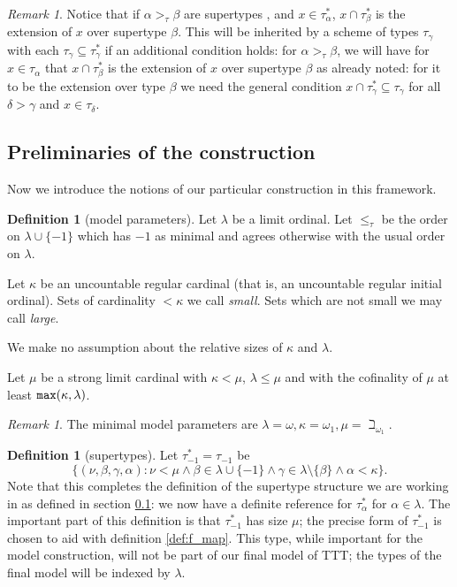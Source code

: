 \documentclass[112pt]{article}
\theoremstyle{definition}
\newtheorem{definition}[theorem]{Definition}
\theoremstyle{remark}
\newtheorem{remark}[theorem]{Remark}
\newcommand{\rk}[1]{{\color{blue}\sl #1}}
\begin{document}
\begin{remark}
Notice that if $\alpha>_\tau \beta$ are supertypes%
, and $x \in \tau^*_\alpha$, $x \cap \tau^*_\beta$ is the extension of $x$ over supertype $\beta$.  This will be inherited by a scheme of types $\tau_\gamma$ with each $\tau_\gamma \subseteq \tau^*_\gamma$ if an additional condition holds:  for $\alpha>_\tau\beta$, we will have
for $x \in \tau_\alpha$ that $x \cap \tau^*_\beta$ is the extension of $x$ over supertype $\beta$ as already noted:  for it to be the extension over type $\beta$ we need the general condition $x \cap \tau^*_\gamma \subseteq \tau_\gamma$ for all $\delta>\gamma$ and $x \in \tau_\delta$.
\end{remark}

\subsection{Preliminaries of the construction}
\label{ss:preliminaries}

Now we introduce the notions of our particular construction in this framework.
\begin{definition}[model parameters]\label{def:model_params}
Let $\lambda$ be a limit ordinal.  Let $\leq_\tau$ be the order on $\lambda \cup \{-1\}$ which has $-1$ as minimal and agrees otherwise with the usual order on $\lambda$.

Let $\kappa$ be an uncountable regular cardinal (that is, an uncountable  regular initial ordinal).  Sets of cardinality $<\kappa$ we call {\em small\/}.  Sets which are not small we may call {\em large\/}.

We make no assumption about the relative sizes of $\kappa$ and $\lambda$.

Let $\mu$ be a strong limit cardinal with $\kappa<\mu$, $\lambda \leq \mu$ and with the cofinality of $\mu$ at least ${\tt max}(\kappa,\lambda)$.
\end{definition}
\begin{remark}\label{rk:example_model_params}
{The minimal model parameters are $\lambda = \omega, \kappa = \omega_1, \mu = \beth_{\omega_1}$.}
\end{remark}

\begin{definition}[supertypes]\label{def:supertypes}
Let $\tau^*_{-1}=\tau_{-1}$ be $$\{(\nu,\beta,\gamma,\alpha):\nu<\mu \wedge  \beta \in \lambda\cup \{-1\} \wedge \gamma \in \lambda \setminus \{\beta\}\wedge \alpha<\kappa\}.$$  Note that this completes the definition of the supertype structure we are working in as defined in section \ref{ss:preliminaries}:  we now have a definite reference
for $\tau^*_\alpha$ for $\alpha\in \lambda$.
The important part of this definition is that $\tau_{-1}^*$ has size $\mu$; the precise form of $\tau_{-1}^*$ is chosen to aid with definition \ref{def:f_map}. This type, while important for the model construction, will not be part of our final model of TTT; the types of the final model  will be indexed by $\lambda$.
\end{definition}
\end{document}
